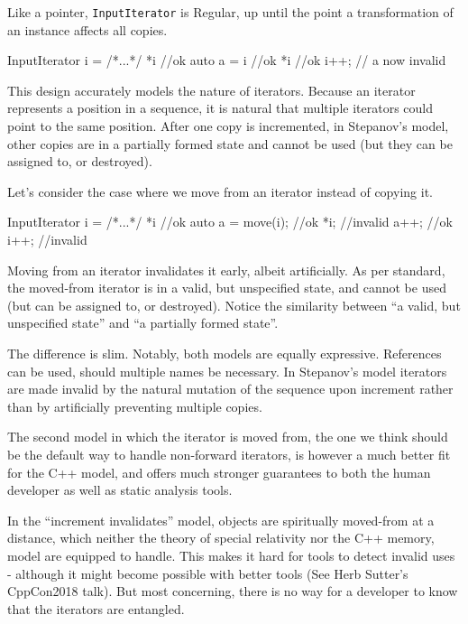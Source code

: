 \documentclass{wg21}
\begin{document}
Like a pointer, \texttt{InputIterator} is Regular, up until the point a
transformation of an instance affects all copies.

\begin{codeblock}
	InputIterator i = /*...*/
	*i    //ok
	auto a = i //ok
	*i    //ok
	i++;  // a now invalid
\end{codeblock}

This design accurately models the nature of iterators. Because an
iterator represents a position in a sequence, it is natural that
multiple iterators could point to the same position. After one copy is
incremented, in Stepanov's model, other copies are in a partially formed
state and cannot be used (but they can be assigned to, or destroyed).

Let's consider the case where we move from an iterator instead of
copying it.


\begin{codeblock}
	InputIterator i = /*...*/
	*i           //ok
	auto a = move(i); //ok
	*i;          //invalid
	a++;         //ok
	i++;         //invalid
\end{codeblock}


Moving from an iterator invalidates it early, albeit artificially. As
per standard, the moved-from iterator is in a valid, but unspecified
state, and cannot be used (but can be assigned to, or destroyed). Notice
the similarity between ``a valid, but unspecified state'' and ``a
partially formed state''.

The difference is slim. Notably, both models are equally expressive.
References can be used, should multiple names be necessary. In
Stepanov's model iterators are made invalid by the natural mutation of
the sequence upon increment rather than by artificially preventing
multiple copies.

The second model in which the iterator is moved from, the one we think
should be the default way to handle non-forward iterators, is however a
much better fit for the C++ model, and offers much stronger guarantees
to both the human developer as well as static analysis tools.

In the ``increment invalidates'' model, objects are spiritually
moved-from at a distance, which neither the theory of special relativity
nor the C++ memory, model are equipped to handle. This makes it hard for
tools to detect invalid uses - although it might become possible with
better tools (See Herb Sutter's CppCon2018 talk). But most concerning,
there is no way for a developer to know that the iterators are
entangled.
\end{document}
